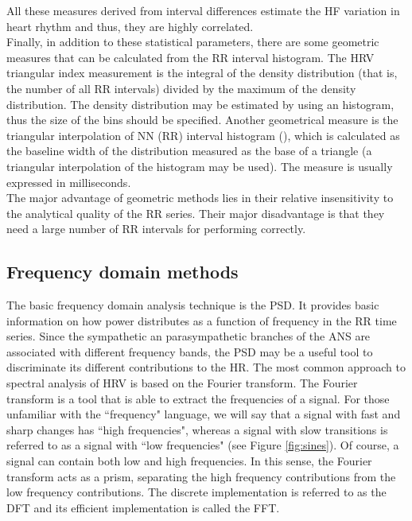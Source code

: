 \documentclass[12pt,lot, lof]{puthesis}
\begin{document}
All these measures derived from interval differences estimate the \gls{HF} 
variation in heart rhythm and thus, they are highly correlated.\\

Finally, in addition to these statistical parameters, there are some geometric 
measures that can be calculated from the RR interval histogram. The \gls{HRV} 
triangular index measurement is the integral of the density distribution (that 
is, the number of all RR intervals) divided by the maximum of the density 
distribution. The density distribution may be estimated by using an histogram, 
thus  the size of the bins should be specified. Another geometrical measure is 
the triangular interpolation of NN (RR) interval histogram 
(), which is calculated as the baseline width of the 
distribution measured as the base of a triangle (a triangular interpolation of 
the histogram may be used). The  measure is usually 
expressed in milliseconds.\\

The major advantage of geometric methods lies in their relative insensitivity 
to the analytical quality of the RR series. Their major disadvantage is that 
they need a large number of RR intervals for performing
correctly.

\subsection{Frequency domain methods}
The basic frequency domain analysis technique  is the \gls{PSD}. It provides 
basic information on how power distributes as a function of frequency in the RR 
time series. Since the sympathetic an parasympathetic branches of the \gls{ANS} 
are associated with different frequency bands, the \gls{PSD} may be a useful 
tool to discriminate its different contributions to the \gls{HR}. The
most common approach to spectral analysis of \gls{HRV} is based on the Fourier 
transform. The Fourier transform is a tool that is able to extract the 
frequencies of a signal. For those unfamiliar with the ``frequency" language, 
we will say that a signal with fast and sharp changes has ``high frequencies", 
whereas a signal with slow transitions is referred to as a signal with ``low 
frequencies" (see Figure \ref{fig:sines}). Of course, a signal can contain both 
low and high frequencies. In this sense, the Fourier transform acts as a prism, 
separating the high frequency contributions from the low frequency 
contributions. The discrete implementation is referred to as the \gls{DFT} and 
its efficient implementation is called the \gls{FFT}.\\
\end{document}
